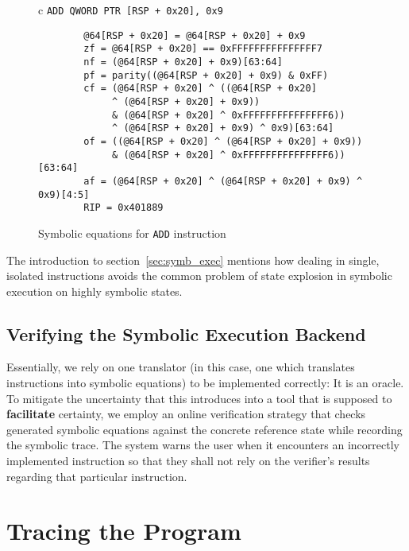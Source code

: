 \begin{figure}[htbp]
    \centering
    \begin{tabular}{c}
    \texttt{ADD        QWORD PTR [RSP + 0x20], 0x9} \\
    \midrule
    \begin{lstlisting}
        @64[RSP + 0x20] = @64[RSP + 0x20] + 0x9
        zf = @64[RSP + 0x20] == 0xFFFFFFFFFFFFFFF7
        nf = (@64[RSP + 0x20] + 0x9)[63:64]
        pf = parity((@64[RSP + 0x20] + 0x9) & 0xFF)
        cf = (@64[RSP + 0x20] ^ ((@64[RSP + 0x20]
             ^ (@64[RSP + 0x20] + 0x9))
             & (@64[RSP + 0x20] ^ 0xFFFFFFFFFFFFFFF6))
             ^ (@64[RSP + 0x20] + 0x9) ^ 0x9)[63:64]
        of = ((@64[RSP + 0x20] ^ (@64[RSP + 0x20] + 0x9))
             & (@64[RSP + 0x20] ^ 0xFFFFFFFFFFFFFFF6))[63:64]
        af = (@64[RSP + 0x20] ^ (@64[RSP + 0x20] + 0x9) ^ 0x9)[4:5]
        RIP = 0x401889
    \end{lstlisting}
    \end{tabular}
    \caption[]{Symbolic equations for \texttt{ADD} instruction}\label{fig:symb_equation_add}
\end{figure}

The introduction to section~\ref{sec:symb_exec} mentions how dealing in single, isolated instructions avoids the
common problem of state explosion in symbolic execution on highly symbolic states.

\subsection{Verifying the Symbolic Execution Backend}\label{sec:symb_exec_backend}

Essentially, we rely on one translator (in this case, one which translates instructions into symbolic equations) to be
implemented correctly: It is an oracle. To mitigate the uncertainty that this introduces into a tool that is supposed to
\textbf{facilitate} certainty, we employ an online verification strategy that checks generated symbolic equations
against the concrete reference state while recording the symbolic trace. The system warns the user when it encounters an
incorrectly implemented instruction so that they shall not rely on the verifier's results regarding that particular
instruction.

\section{Tracing the Program}

